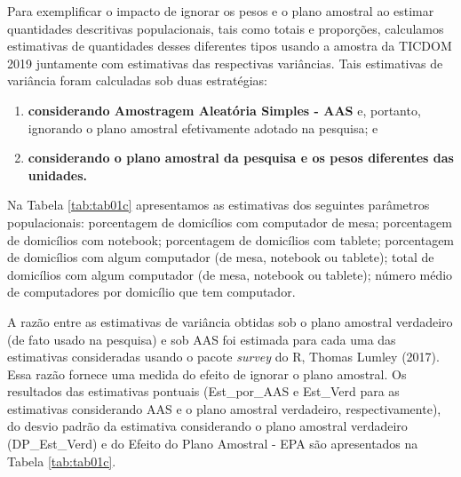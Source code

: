 \documentclass[
  12pt,
  brazilian,
]{book}
\theoremstyle{definition}
\theoremstyle{definition}
\theoremstyle{definition}
\theoremstyle{definition}
\theoremstyle{remark}
\begin{document}
Para exemplificar o impacto de ignorar os pesos e o plano amostral ao estimar quantidades descritivas populacionais, tais como totais e proporções, calculamos estimativas de quantidades desses diferentes tipos usando a amostra da TICDOM 2019 juntamente com estimativas das respectivas variâncias. Tais estimativas de variância foram calculadas sob duas estratégias:

\begin{enumerate}
\def\labelenumi{\alph{enumi})}
\item
  \textbf{considerando Amostragem Aleatória Simples - AAS} e, portanto, ignorando o plano amostral efetivamente adotado na pesquisa; e
\item
  \textbf{considerando o plano amostral da pesquisa e os pesos diferentes das unidades.}
\end{enumerate}

Na Tabela \ref{tab:tab01c} apresentamos as estimativas dos seguintes parâmetros populacionais: porcentagem de domicílios com computador de mesa; porcentagem de domicílios com notebook; porcentagem de domicílios com tablete; porcentagem de domicílios com algum computador (de mesa, notebook ou tablete); total de domicílios com algum computador (de mesa, notebook ou tablete); número médio de computadores por domicílio que tem computador.

A razão entre as estimativas de variância obtidas sob o plano amostral verdadeiro (de fato usado na pesquisa) e sob AAS foi estimada para cada uma das estimativas consideradas usando o pacote \emph{survey} do R, Thomas Lumley (2017). Essa razão fornece uma medida do efeito de ignorar o plano amostral. Os resultados das estimativas pontuais (Est\_por\_AAS e Est\_Verd para as estimativas considerando AAS e o plano amostral verdadeiro, respectivamente), do desvio padrão da estimativa considerando o plano amostral verdadeiro (DP\_Est\_Verd) e do Efeito do Plano Amostral - EPA são apresentados na Tabela \ref{tab:tab01c}.
\end{document}
